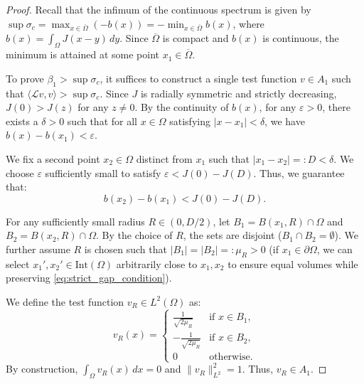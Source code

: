 \documentclass[11pt, a4paper]{article}
\theoremstyle{break}
\theoremstyle{break}
\theoremstyle{break}
\theoremstyle{break}
\theoremstyle{break}
\theoremstyle{break}
\theoremstyle{break}
\theoremstyle{break}
\theoremstyle{break}
\begin{document}
\begin{proof}
Recall that the infimum of the continuous spectrum is given by $\sup \sigma_c = \max_{x \in \overline{\Omega}} (-b(x)) = -\min_{x \in \overline{\Omega}} b(x)$, where $b(x) = \int_\Omega J(x-y) \, dy$. Since $\overline{\Omega}$ is compact and $b(x)$ is continuous, the minimum is attained at some point $x_1 \in \overline{\Omega}$. 

To prove $\beta_1 > \sup \sigma_c$, it suffices to construct a single test function $v \in A_1$ such that $\langle \mathcal{L}v, v \rangle > \sup \sigma_c$. Since $J$ is radially symmetric and strictly decreasing, $J(0) > J(z)$ for any $z \neq 0$. By the continuity of $b(x)$, for any $\varepsilon > 0$, there exists a $\delta > 0$ such that for all $x \in \Omega$ satisfying $|x - x_1| < \delta$, we have $b(x) - b(x_1) < \varepsilon$. 

We fix a second point $x_2 \in \Omega$ distinct from $x_1$ such that $|x_1 - x_2| =: D < \delta$. We choose $\varepsilon$ sufficiently small to satisfy $\varepsilon < J(0) - J(D)$. Thus, we guarantee that:
\begin{equation} \label{eq:strict_gap_condition}
    b(x_2) - b(x_1) < J(0) - J(D).
\end{equation}

For any sufficiently small radius $R \in (0, D/2)$, let $B_1 = B(x_1, R) \cap \Omega$ and $B_2 = B(x_2, R) \cap \Omega$. By the choice of $R$, the sets are disjoint ($B_1 \cap B_2 = \emptyset$). We further assume $R$ is chosen such that $|B_1| = |B_2| =: \mu_R > 0$ (if $x_1 \in \partial \Omega$, we can select $x_1', x_2' \in \text{Int}(\Omega)$ arbitrarily close to $x_1, x_2$ to ensure equal volumes while preserving \eqref{eq:strict_gap_condition}).

We define the test function $v_R \in L^2(\Omega)$ as:
\begin{equation}
    v_R(x) = 
    \begin{cases} 
        \frac{1}{\sqrt{2\mu_R}} & \text{if } x \in B_1, \\
        -\frac{1}{\sqrt{2\mu_R}} & \text{if } x \in B_2, \\
        0 & \text{otherwise}.
    \end{cases}
\end{equation}
By construction, $\int_\Omega v_R(x) \, dx = 0$ and $\|v_R\|_{L^2}^2 = 1$. Thus, $v_R \in A_1$.


\end{proof}
\end{document}
